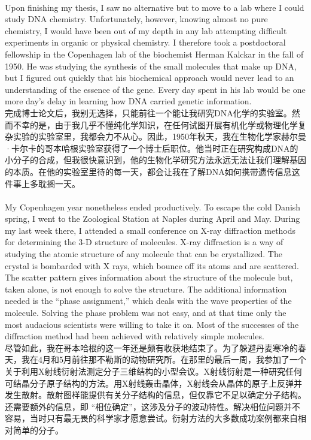 \documentclass{article}
\begin{document}
\\
Upon finishing my thesis, I saw no alternative but to move to a lab where I could study DNA chemistry. Unfortunately, however, knowing almost no pure chemistry, I would have been out of my depth in any lab attempting difficult experiments in organic or physical chemistry. I therefore took a postdoctoral fellowship in the Copenhagen lab of the biochemist Herman Kalckar in the fall of 1950. He was studying the synthesis of the small molecules that make up DNA, but I figured out quickly that his biochemical approach would never lead to an understanding of the essence of the gene. Every day spent in his lab would be one more day’s delay in learning how DNA carried genetic information.\\
完成博士论文后，我别无选择，只能前往一个能让我研究DNA化学的实验室。然而不幸的是，由于我几乎不懂纯化学知识，在任何试图开展有机化学或物理化学复杂实验的实验室里，我都会力不从心。因此，1950年秋天，我在生物化学家赫尔曼·卡尔卡的哥本哈根实验室获得了一个博士后职位。他当时正在研究构成DNA的小分子的合成，但我很快意识到，他的生物化学研究方法永远无法让我们理解基因的本质。在他的实验室里待的每一天，都会让我在了解DNA如何携带遗传信息这件事上多耽搁一天。\\

\\
My Copenhagen year nonetheless ended productively. To escape the cold Danish spring, I went to the Zoological Station at Naples during April and May. During my last week there, I attended a small conference on X-ray diffraction methods for determining the 3-D structure of molecules. X-ray diffraction is a way of studying the atomic structure of any molecule that can be crystallized. The crystal is bombarded with X rays, which bounce off its atoms and are scattered. The scatter pattern gives information about the structure of the molecule but, taken alone, is not enough to solve the structure. The additional information needed is the “phase assignment,” which deals with the wave properties of the molecule. Solving the phase problem was not easy, and at that time only the most audacious scientists were willing to take it on. Most of the successes of the diffraction method had been achieved with relatively simple molecules.\\
尽管如此，我在哥本哈根的这一年还是颇有收获地结束了。为了躲避丹麦寒冷的春天，我在4月和5月前往那不勒斯的动物研究所。在那里的最后一周，我参加了一个关于利用X射线衍射法测定分子三维结构的小型会议。X射线衍射是一种研究任何可结晶分子原子结构的方法。用X射线轰击晶体，X射线会从晶体的原子上反弹并发生散射。散射图样能提供有关分子结构的信息，但仅靠它不足以确定分子结构。还需要额外的信息，即 “相位确定”，这涉及分子的波动特性。解决相位问题并不容易，当时只有最无畏的科学家才愿意尝试。衍射方法的大多数成功案例都来自相对简单的分子。\\
\end{document}
